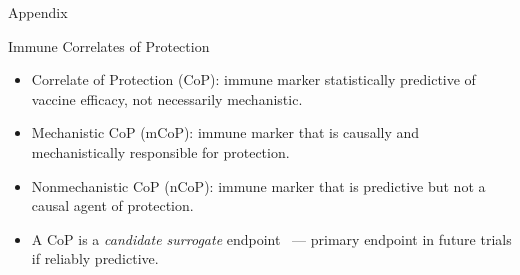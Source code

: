 \documentclass{beamer}
\begin{document}
\appendix
\begin{frame}[standout]
  Appendix
\end{frame}


\begin{frame}[c]{Immune Correlates of
  Protection~\citep{plotkin2012nomenclature}}

\begin{center}
\begin{itemize}
  \itemsep8pt
  \item Correlate of Protection (CoP): immune marker statistically predictive
    of vaccine efficacy, not necessarily mechanistic.
  \item Mechanistic CoP (mCoP): immune marker that is causally and
    mechanistically responsible for protection.
  \item Nonmechanistic CoP (nCoP): immune marker that is predictive but not a
    causal agent of protection.
  \item A CoP is a \textit{candidate surrogate}
      endpoint~\citep{prentice1989surrogate} --- primary
      endpoint in future trials if reliably predictive.
\end{itemize}
\end{center}

\note{
}

\end{frame}

\end{document}
